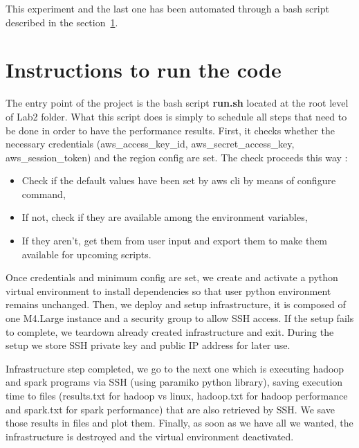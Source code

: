 \documentclass[11pt]{article}
\begin{document}
\vspace*{0.5cm}
\noindent
This experiment and the last one has been automated through a bash script described in the section~\ref{instructions}.

\section{Instructions to run the code}  \label{instructions}

The entry point of the project is the bash script \textbf{run.sh} located at the root level of Lab2 folder. What this script does is simply to schedule all steps that need to be done in order to have the performance results.
First, it checks whether the necessary credentials (aws\_access\_key\_id, aws\_secret\_access\_key, aws\_session\_token) and the region config are set. The check proceeds this way :
\begin{itemize}
\item Check if the default values have been set by aws cli by means of configure command,
\item If not, check if they are available among the environment variables,
\item If they aren't, get them from user input and export them to make them available for upcoming scripts.
\end{itemize}
Once credentials and minimum config are set, we create and activate a python virtual environment to install dependencies so that user python environment remains unchanged. Then, we deploy and setup infrastructure, it is composed of one M4.Large instance and a security group to allow SSH access. If the setup fails to complete, we teardown already created infrastructure and exit. During the setup we store SSH private key and public IP address for later use.

\vspace*{0.5cm}
\noindent
Infrastructure step completed, we go to the next one which is executing hadoop and spark programs via SSH (using paramiko python library), saving execution time to files (results.txt for hadoop vs linux, hadoop.txt for hadoop performance and spark.txt for spark performance) that are also retrieved by SSH. We save those results in files and plot them. Finally, as soon as we have all we wanted, the infrastructure is destroyed and the virtual environment deactivated.
\end{document}
